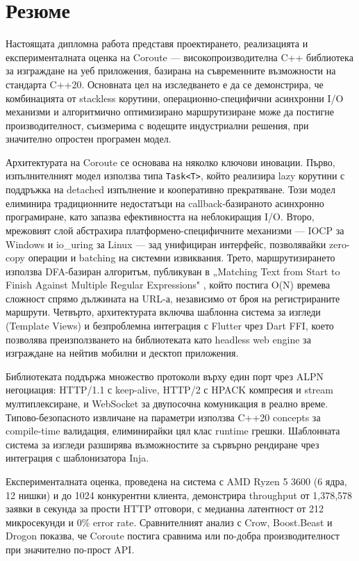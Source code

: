\section*{Резюме}

Настоящата дипломна работа представя проектирането, реализацията и експерименталната оценка на Coroute --- високопроизводителна C++ библиотека за изграждане на уеб приложения, базирана на съвременните възможности на стандарта C++20. Основната цел на изследването е да се демонстрира, че комбинацията от stackless корутини, операционно-специфични асинхронни I/O механизми и алгоритмично оптимизирано маршрутизиране може да постигне производителност, съизмерима с водещите индустриални решения, при значително опростен програмен модел.

Архитектурата на Coroute се основава на няколко ключови иновации. Първо, изпълнителният модел използва типа \texttt{Task<T>}, който реализира lazy корутини с поддръжка на detached изпълнение и кооперативно прекратяване. Този модел елиминира традиционните недостатъци на callback-базираното асинхронно програмиране, като запазва ефективността на неблокиращия I/O. Второ, мрежовият слой абстрахира платформено-специфичните механизми --- IOCP за Windows и io\_uring за Linux --- зад унифициран интерфейс, позволявайки zero-copy операции и batching на системни извиквания. Трето, маршрутизирането използва DFA-базиран алгоритъм, публикуван в „Matching Text from Start to Finish Against Multiple Regular Expressions" \cite{stankov2024regex}, който постига O(N) времева сложност спрямо дължината на URL-а, независимо от броя на регистрираните маршрути. Четвърто, архитектурата включва шаблонна система за изгледи (Template Views) и безпроблемна интеграция с Flutter чрез Dart FFI, което позволява преизползването на библиотеката като headless web engine за изграждане на нейтив мобилни и десктоп приложения.

Библиотеката поддържа множество протоколи върху един порт чрез ALPN негоциация: HTTP/1.1 с keep-alive, HTTP/2 с HPACK компресия и stream мултиплексиране, и WebSocket за двупосочна комуникация в реално време. Типово-безопасното извличане на параметри използва C++20 concepts за compile-time валидация, елиминирайки цял клас runtime грешки. Шаблонната система за изгледи разширява възможностите за сървърно рендиране чрез интеграция с шаблонизатора Inja.

Експерименталната оценка, проведена на система с AMD Ryzen 5 3600 (6 ядра, 12 нишки) и до 1024 конкурентни клиента, демонстрира throughput от 1,378,578 заявки в секунда за прости HTTP отговори, с медианна латентност от 212 микросекунди и 0\% error rate. Сравнителният анализ с Crow, Boost.Beast и Drogon показва, че Coroute постига сравнима или по-добра производителност при значително по-прост API.

